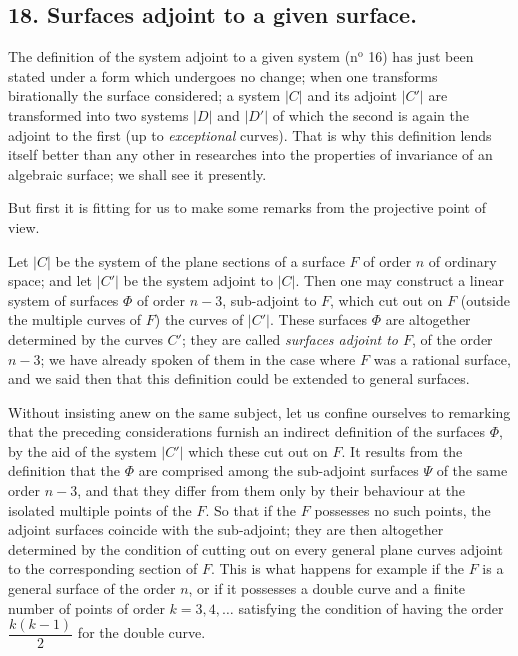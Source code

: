 \documentclass{article}
\begin{document}

\subsection*{18. Surfaces adjoint to a given surface.}

The definition of the system adjoint to a given system (n${}^{\text{o}}$ 16) has just been stated under a form which undergoes no change; when one transforms birationally the surface considered; a system $|C|$ and its adjoint $|C'|$ are transformed into two systems $|D|$ and $|D'|$ of which the second is again the adjoint to the first (up to \emph{exceptional} curves). That is why this definition lends itself better than any other in researches into the properties of invariance of an algebraic surface; we shall see it presently.

But first it is fitting for us to make some remarks from the projective point of view.

Let $|C|$ be the system of the plane sections of a surface $F$ of order $n$ of ordinary space; and let $|C'|$ be the system adjoint to $|C|$. Then one may construct a linear system of surfaces $\Phi$ of order $n - 3$, sub-adjoint to $F$, which cut out on $F$ (outside the multiple curves of $F$) the curves of $|C'|$. These surfaces $\Phi$ are altogether determined by the curves $C'$; they are called \emph{surfaces adjoint to $F$}, of the order $n - 3$; we have already spoken of them in the case where $F$ was a rational surface, and we said then that this definition could be extended to general surfaces.

Without insisting anew on the same subject, let us confine ourselves to remarking that the preceding considerations furnish an indirect definition of the surfaces $\Phi$, by the aid of the system $|C'|$ which these cut out on $F$. It results from the definition that the $\Phi$ are comprised among the sub-adjoint surfaces $\Psi$ of the same order $n - 3$, and that they differ from them only by their behaviour at the isolated multiple points of the $F$. So that if the $F$ possesses no such points, the adjoint surfaces coincide with the sub-adjoint; they are then altogether determined by the condition of cutting out on every general plane curves adjoint to the corresponding section of $F$. This is what happens for example if the $F$ is a general surface of the order $n$, or if it possesses a double curve and a finite number of points of order $k = 3, 4, \ldots$ satisfying the condition of having the order $\dfrac{k(k-1)}{2}$ for the double curve.
\end{document}
